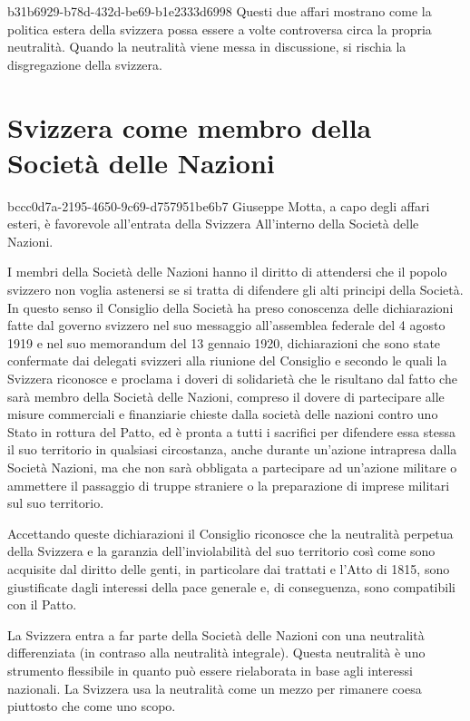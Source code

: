 \documentclass[preview]{standalone}
\begin{document}
\begin{snippet}{b31b6929-b78d-432d-be69-b1e2333d6998}
    Questi due affari mostrano come la politica estera della svizzera possa essere a volte controversa circa
    la propria neutralità.
    Quando la neutralità viene messa in discussione, si rischia la disgregazione della svizzera.
\end{snippet}

\section{Svizzera come membro della Società delle Nazioni}

\begin{snippet}{bccc0d7a-2195-4650-9c69-d757951be6b7}
    Giuseppe Motta, a capo degli affari esteri, è favorevole all'entrata della Svizzera
    All'interno della Società delle Nazioni.
    
    I membri della Società delle Nazioni hanno il diritto di attendersi che il popolo
    svizzero non voglia astenersi se si tratta di difendere gli alti principi della Società. In
    questo senso il Consiglio della Società ha preso conoscenza delle dichiarazioni fatte
    dal governo svizzero nel suo messaggio all'assemblea federale del 4 agosto 1919 e
    nel suo memorandum del 13 gennaio 1920, dichiarazioni che sono state confermate
    dai delegati svizzeri alla riunione del Consiglio e secondo le quali la Svizzera
    riconosce e proclama i doveri di solidarietà che le risultano dal fatto che sarà membro
    della Società delle Nazioni, compreso il dovere di partecipare alle misure
    commerciali e finanziarie chieste dalla società delle nazioni contro uno Stato in
    rottura del Patto, ed è pronta a tutti i sacrifici per difendere essa stessa il suo
    territorio in qualsiasi circostanza, anche durante un'azione intrapresa dalla Società
    Nazioni, ma che non sarà obbligata a partecipare ad un'azione militare o ammettere
    il passaggio di truppe straniere o la preparazione di imprese militari sul suo
    territorio.
    
    Accettando queste dichiarazioni il Consiglio riconosce che la neutralità perpetua
    della Svizzera e la garanzia dell'inviolabilità del suo territorio così come sono
    acquisite dal diritto delle genti, in particolare dai trattati e l'Atto di 1815, sono
    giustificate dagli interessi della pace generale e, di conseguenza, sono compatibili con
    il Patto.
    
    La Svizzera entra a far parte della Società delle Nazioni con una neutralità differenziata
    (in contraso alla neutralità integrale).
    Questa neutralità è uno strumento flessibile in quanto può essere rielaborata in base
    agli interessi nazionali. La Svizzera usa la neutralità come un mezzo
    per rimanere coesa piuttosto che come uno scopo.
    

\end{snippet}
\end{document}
